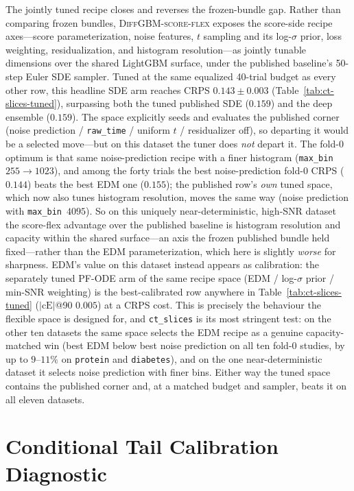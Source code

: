 \documentclass{article}
\begin{document}
The jointly tuned recipe closes and reverses the frozen-bundle gap. Rather than comparing frozen bundles, \textsc{DiffGBM-score-flex} exposes the score-side recipe axes---score parameterization, noise features, $t$ sampling and its log-$\sigma$ prior, loss weighting, residualization, and histogram resolution---as jointly tunable dimensions over the shared LightGBM surface, under the published baseline's 50-step Euler SDE sampler. Tuned at the same equalized 40-trial budget as every other row, this headline SDE arm reaches CRPS $0.143 \pm 0.003$ (Table~\ref{tab:ct-slices-tuned}), surpassing both the tuned published SDE ($0.159$) and the deep ensemble ($0.159$). The space explicitly seeds and evaluates the published corner (noise prediction / \texttt{raw\_time} / uniform $t$ / residualizer off), so departing it would be a selected move---but on this dataset the tuner does \emph{not} depart it. The fold-0 optimum is that same noise-prediction recipe with a finer histogram (\texttt{max\_bin}\ $255 \to 1023$), and among the forty trials the best noise-prediction fold-0 CRPS ($0.144$) beats the best EDM one ($0.155$); the published row's \emph{own} tuned space, which now also tunes histogram resolution, moves the same way (noise prediction with \texttt{max\_bin}\ $4095$). So on this uniquely near-deterministic, high-SNR dataset the score-flex advantage over the published baseline is histogram resolution and capacity within the shared surface---an axis the frozen published bundle held fixed---rather than the EDM parameterization, which here is slightly \emph{worse} for sharpness. EDM's value on this dataset instead appears as calibration: the separately tuned PF-ODE arm of the same recipe space (EDM / log-$\sigma$ prior / min-SNR weighting) is the best-calibrated row anywhere in Table~\ref{tab:ct-slices-tuned} ($|\text{cE}|$@90 $0.005$) at a CRPS cost. This is precisely the behaviour the flexible space is designed for, and \texttt{ct\_slices} is its most stringent test: on the other ten datasets the same space selects the EDM recipe as a genuine capacity-matched win (best EDM below best noise prediction on all ten fold-0 studies, by up to $9$--$11\%$ on \texttt{protein} and \texttt{diabetes}), and on the one near-deterministic dataset it selects noise prediction with finer bins. Either way the tuned space contains the published corner and, at a matched budget and sampler, beats it on all eleven datasets.

\section{Conditional Tail Calibration Diagnostic}\label{app:tail-diagnostic}
\end{document}
